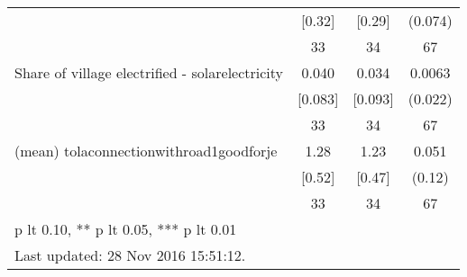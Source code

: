 \begin{table}[htbp]
\begin{tabular*}{0.9\hsize}{@{\hskip\tabcolsep\extracolsep\fill}l*{1}{ccc}}
                                &   [0.32]&   [0.29]&  (0.074)         \\
                                &       33&       34&       67         \\
Share of village electrified - solarelectricity&    0.040&    0.034&   0.0063         \\
                                &  [0.083]&  [0.093]&  (0.022)         \\
                                &       33&       34&       67         \\
(mean) tolaconnectionwithroad1goodforje&     1.28&     1.23&    0.051         \\
                                &   [0.52]&   [0.47]&   (0.12)         \\
                                &       33&       34&       67         \\
\bottomrule
\multicolumn{4}{l}{\footnotesize * p lt 0.10, ** p lt 0.05, *** p lt 0.01}\\
\multicolumn{4}{l}{\footnotesize Last updated: 28 Nov 2016 15:51:12.}\\
\end{tabular*}
\end{table}
